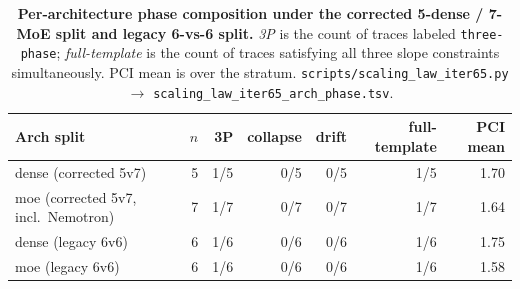 \begin{table}[t]
  \centering
  \small
  \begin{tabular}{lrrrrrr}
    \toprule
    Arch split & $n$ & 3P & collapse & drift & full-template & PCI mean \\
    \midrule
      dense (corrected 5v7) & 5 & 1/5 & 0/5 & 0/5 & 1/5 & 1.70 \\
      moe (corrected 5v7, incl.\ Nemotron) & 7 & 1/7 & 0/7 & 0/7 & 1/7 & 1.64 \\
    \midrule
      dense (legacy 6v6) & 6 & 1/6 & 0/6 & 0/6 & 1/6 & 1.75 \\
      moe (legacy 6v6) & 6 & 1/6 & 0/6 & 0/6 & 1/6 & 1.58 \\
    \bottomrule
  \end{tabular}
  \caption{\textbf{Per-architecture phase composition under the corrected 5-dense / 7-MoE split and legacy 6-vs-6 split.}
    \emph{3P} is the count of traces labeled \texttt{three-phase};
    \emph{full-template} is the count of traces satisfying all
    three slope constraints simultaneously.  PCI mean is over
    the stratum.  \texttt{scripts/scaling\_law\_iter65.py}
    $\to$ \texttt{scaling\_law\_iter65\_arch\_phase.tsv}.}
  \label{tab:iter65-arch}
\end{table}

